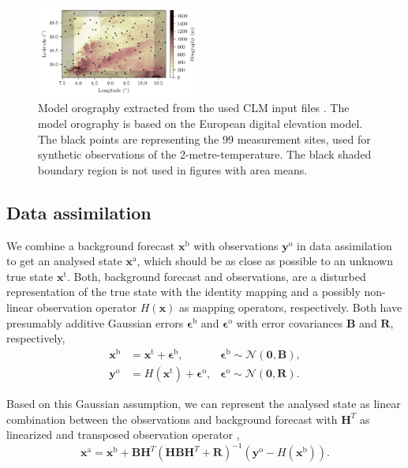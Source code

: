 \documentclass[HESSD, manuscript]{copernicus}
\begin{document}
\begin{figure}[ht]
	\includegraphics[width=0.48\textwidth]{figures/fig_02_orography.png}
	\caption{
		Model orography extracted from the used CLM input files \citep{european_environment_agency_digital_2013}.
		The model orography is based on the European digital elevation model.
		The black points are representing the 99 measurement sites, used for synthetic observations of the 2-metre-temperature.
		The black shaded boundary region is not used in figures with area means.
	}
	\label{fig:model_orography}
\end{figure}

\subsection{Data assimilation}

We combine a background forecast $\textbf{x}^{\text{b}}$ with observations $\mathbf{y}^\text{o}$ in data assimilation to get an analysed state $\textbf{x}^{\text{a}}$, which should be as close as possible to an unknown true state $\textbf{x}^{\text{t}}$.
Both, background forecast and observations, are a disturbed representation of the true state with the identity mapping and a possibly non-linear observation operator $H(\mathbf{x})$ as mapping operators, respectively.
Both have presumably additive Gaussian errors $\mathbf{\epsilon}^\text{b}$ and $\mathbf{\epsilon}^\text{o}$ with error covariances $\textbf{B}$ and $\textbf{R}$, respectively,
\begin{align}
	\mathbf{x}^\text{b} &= \mathbf{x}^\text{t} + \mathbf{\epsilon}^\text{b}, & \mathbf{\epsilon}^\text{b} \sim \mathcal{N}(\mathbf{0}, \mathbf{B}),\label{eq:formulation_kf_back}\\
	\mathbf{y}^\text{o} &= H(\mathbf{x}^\text{t}) + \mathbf{\epsilon}^\text{o}, & \mathbf{\epsilon}^\text{o} \sim \mathcal{N}(\mathbf{0}, \mathbf{R}).
	\label{eq:formulation_kf_obsop}
\end{align}

Based on this Gaussian assumption, we can represent the analysed state as linear combination between the observations and background forecast with $\mathbf{H}^{T}$ as linearized and transposed observation operator \citep{kalman_new_1960,kalnay_atmospheric_2003},
\begin{equation}
	\mathbf{x}^\text{a} = \mathbf{x}^\text{b} + \mathbf{B}\mathbf{H}^{T}(\mathbf{H}\mathbf{B}\mathbf{H}^{T} + \mathbf{R})^{-1} (\mathbf{y}^\text{o} - H(\mathbf{x}^\text{b})).\label{eq:formulation_kalman_filter}
\end{equation}
\end{document}
